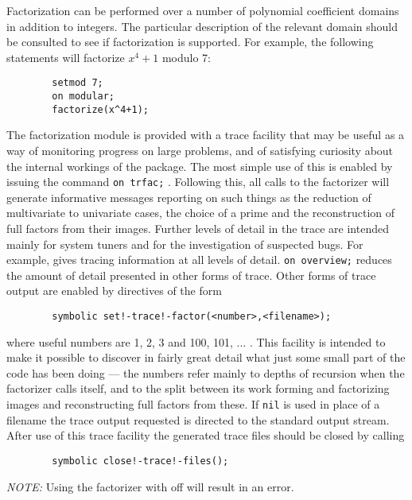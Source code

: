 Factorization can be performed over a number of polynomial coefficient
domains in addition to integers. The particular description of the relevant
domain should be consulted to see if factorization is supported. For
example, the following statements will factorize $x^{4}+1$ modulo 7:
\begin{verbatim}
        setmod 7;
        on modular;
        factorize(x^4+1);
\end{verbatim}
\hypertarget{switch:TRFAC}{}
\hypertarget{switch:OVERVIEW}{}
The factorization module is provided with a trace facility that may be useful
as a way of monitoring progress on large problems, and of satisfying
curiosity about the internal workings of the package. The most simple use
of this is enabled by issuing the {\REDUCE} command
\texttt{on trfac;} .
Following this, all calls to the factorizer will generate informative
messages reporting on such things as the reduction of multivariate to
univariate cases, the choice of a prime and the reconstruction of full
factors from their images.  Further levels of detail in the trace are
intended mainly for system tuners and for the investigation of suspected
bugs.  For example,  gives tracing information at all levels
of detail.
\texttt{on overview;} reduces the amount of detail presented in other forms of
trace.  Other forms of trace output are enabled by directives of the form
\begin{verbatim}
        symbolic set!-trace!-factor(<number>,<filename>);
\end{verbatim}
where useful numbers are 1, 2, 3 and 100, 101, ... .  This facility is
intended to make it possible to discover in fairly great detail what just
some small part of the code has been doing --- the numbers refer mainly to
depths of recursion when the factorizer calls itself, and to the split
between its work forming and factorizing images and reconstructing full
factors from these.  If \texttt{nil} is used in place of a filename the trace
output requested is directed to the standard output stream.  After use of
this trace facility the generated trace files should be closed by calling
\begin{verbatim}
        symbolic close!-trace!-files();
\end{verbatim}
\textit{NOTE:} Using the factorizer with  off will
result in an error.

